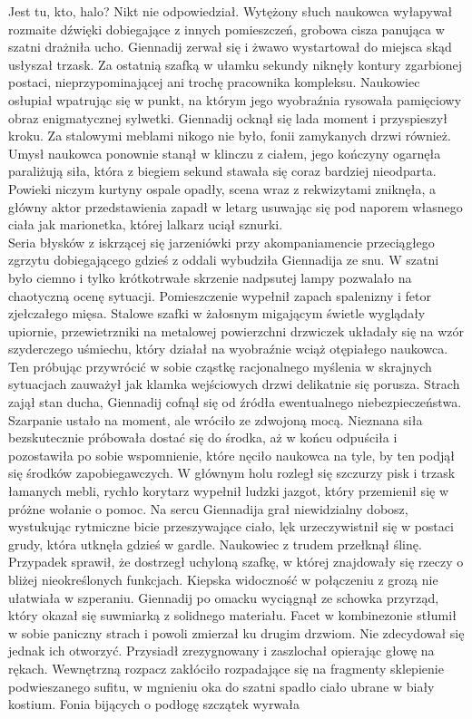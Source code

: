 \documentclass[../MAIN.tex]{subfiles}
\begin{document}
\sx Jest tu, kto, halo?\qd 
Nikt nie odpowiedział. Wytężony słuch naukowca wyłapywał rozmaite dźwięki dobiegające z innych pomieszczeń, grobowa cisza panująca w szatni drażniła ucho. Giennadij zerwał się i żwawo wystartował do miejsca skąd usłyszał trzask. Za ostatnią szafką w ułamku sekundy niknęły kontury zgarbionej postaci, nieprzypominającej ani trochę pracownika kompleksu. Naukowiec osłupiał wpatrując się w punkt, na którym jego wyobraźnia rysowała pamięciowy obraz enigmatycznej sylwetki. Giennadij ocknął się lada moment i przyspieszył kroku. Za stalowymi meblami nikogo nie było, fonii zamykanych drzwi również. Umysł naukowca ponownie stanął w klinczu z ciałem, jego kończyny ogarnęła paraliżują siła, która z biegiem sekund stawała się coraz bardziej nieodparta. Powieki niczym kurtyny ospale opadły, scena wraz z rekwizytami zniknęła, a główny aktor przedstawienia zapadł w letarg usuwając się pod naporem własnego ciała jak marionetka, której lalkarz uciął sznurki.\\ 
Seria błysków z iskrzącej się jarzeniówki przy akompaniamencie przeciągłego zgrzytu dobiegającego gdzieś z oddali wybudziła Giennadija ze snu. W szatni było ciemno i tylko krótkotrwałe skrzenie nadpsutej lampy pozwalało na chaotyczną ocenę sytuacji. Pomieszczenie wypełnił zapach spalenizny i fetor zjełczałego mięsa. Stalowe szafki w żałosnym migającym świetle wyglądały upiornie, przewietrzniki na metalowej powierzchni drzwiczek układały się na wzór szyderczego uśmiechu, który działał na wyobraźnie wciąż otępiałego naukowca. Ten próbując przywrócić w sobie cząstkę racjonalnego myślenia w skrajnych sytuacjach zauważył jak klamka wejściowych drzwi delikatnie się porusza. Strach zajął stan ducha, Giennadij cofnął się od źródła ewentualnego niebezpieczeństwa. Szarpanie ustało na moment, ale wróciło ze zdwojoną mocą. Nieznana siła bezskutecznie próbowała dostać się do środka, aż w końcu odpuściła i pozostawiła po sobie wspomnienie, które nęciło naukowca na tyle, by ten podjął się środków zapobiegawczych. W głównym 
holu rozległ się szczurzy pisk i trzask łamanych mebli, rychło korytarz wypełnił ludzki jazgot, który przemienił się w próżne wołanie o pomoc. Na sercu Giennadija grał niewidzialny dobosz, wystukując rytmiczne bicie przeszywające ciało, lęk urzeczywistnił się w postaci grudy, która utknęła gdzieś w gardle. Naukowiec z trudem przełknął ślinę. Przypadek sprawił, że dostrzegł uchyloną szafkę, w której znajdowały się rzeczy o bliżej nieokreślonych funkcjach. Kiepska widoczność w połączeniu z grozą nie ułatwiała w szperaniu. Giennadij po omacku wyciągnął ze schowka przyrząd, który okazał się suwmiarką z solidnego materiału. Facet w kombinezonie stłumił w sobie paniczny strach i powoli zmierzał ku drugim drzwiom. Nie zdecydował się jednak ich otworzyć. Przysiadł zrezygnowany i zaszlochał opierając głowę na rękach. Wewnętrzną rozpacz zakłóciło rozpadające się na fragmenty sklepienie podwieszanego sufitu, w mgnieniu oka do szatni spadło ciało ubrane w biały kostium. Fonia bijących o podłogę szczątek wyrwała 
\end{document}
